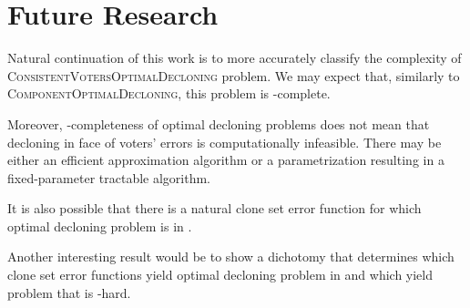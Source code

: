 \section{Future Research}

Natural continuation of this work is to more accurately classify the complexity of \textsc{ConsistentVotersOptimalDecloning} problem.
We may expect that, similarly to \textsc{ComponentOptimalDecloning}, this problem is \np-complete.

Moreover, \np-completeness of optimal decloning problems does not mean
that decloning in face of voters' errors is computationally infeasible.
There may be either an efficient approximation algorithm
or a parametrization resulting in a fixed-parameter tractable algorithm.

It is also possible that there is a natural clone set error function
for which optimal decloning problem is in \p.

Another interesting result would be to show a dichotomy that determines
which clone set error functions yield optimal decloning problem in \p
and which yield problem that is \np-hard.
